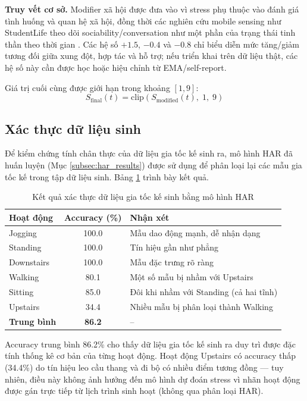 \textbf{Truy vết cơ sở.} Modifier xã hội được đưa vào vì stress phụ thuộc vào đánh giá tình huống và quan hệ xã hội, đồng thời các nghiên cứu mobile sensing như StudentLife theo dõi sociability/conversation như một phần của trạng thái tinh thần theo thời gian \cite{lazarus1984stress, wang2014studentlife}. Các hệ số $+1.5$, $-0.4$ và $-0.8$ chỉ biểu diễn mức tăng/giảm tương đối giữa xung đột, hợp tác và hỗ trợ; nếu triển khai trên dữ liệu thật, các hệ số này cần được học hoặc hiệu chỉnh từ EMA/self-report.

Giá trị cuối cùng được giới hạn trong khoảng $[1, 9]$:
\begin{equation}
    S_{\text{final}}(t) = \text{clip}(S_{\text{modified}}(t), \; 1, \; 9)
\end{equation}

\subsection{Xác thực dữ liệu sinh}
\label{subsec:data_validation}

Để kiểm chứng tính chân thực của dữ liệu gia tốc kế sinh ra, mô hình HAR đã huấn luyện (Mục \ref{subsec:har_results}) được sử dụng để phân loại lại các mẫu gia tốc kế trong tập dữ liệu sinh. Bảng \ref{tab:data_validation} trình bày kết quả.

\begin{table}[H]
\centering
\caption{Kết quả xác thực dữ liệu gia tốc kế sinh bằng mô hình HAR}
\label{tab:data_validation}
\begin{tabular}{|l|c|l|}
\hline
\textbf{Hoạt động} & \textbf{Accuracy (\%)} & \textbf{Nhận xét} \\
\hline
Jogging     & 100.0 & Mẫu dao động mạnh, dễ nhận dạng \\
Standing    & 100.0 & Tín hiệu gần như phẳng \\
Downstairs  & 100.0 & Mẫu đặc trưng rõ ràng \\
Walking     & 80.1  & Một số mẫu bị nhầm với Upstairs \\
Sitting     & 85.0  & Đôi khi nhầm với Standing (cả hai tĩnh) \\
Upstairs    & 34.4  & Nhiều mẫu bị phân loại thành Walking \\
\hline
\textbf{Trung bình} & \textbf{86.2} & -- \\
\hline
\end{tabular}
\end{table}

Accuracy trung bình 86.2\% cho thấy dữ liệu gia tốc kế sinh ra duy trì được đặc tính thống kê cơ bản của từng hoạt động. Hoạt động Upstairs có accuracy thấp (34.4\%) do tín hiệu leo cầu thang và đi bộ có nhiều điểm tương đồng — tuy nhiên, điều này không ảnh hưởng đến mô hình dự đoán stress vì nhãn hoạt động được gán trực tiếp từ lịch trình sinh hoạt (không qua phân loại HAR).

